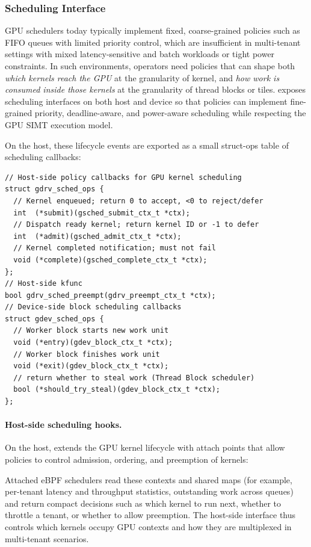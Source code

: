 \subsubsection{Scheduling Interface}
\label{sec:design-sched}

GPU schedulers today typically implement fixed, coarse-grained policies such as FIFO
queues with limited priority control, which are insufficient in multi-tenant settings
with mixed latency-sensitive and batch workloads or tight power constraints. In such
environments, operators need policies that can shape both \emph{which kernels reach
the GPU} at the granularity of kernel, and \emph{how work is consumed inside those kernels} at the granularity of thread blocks or tiles. \sys exposes scheduling interfaces on both host and device
so that policies can implement fine-grained priority, deadline-aware, and power-aware
scheduling while respecting the GPU SIMT execution model.

On the host, these lifecycle events are exported as a small struct-ops table of
scheduling callbacks:

\begin{verbatim}
// Host-side policy callbacks for GPU kernel scheduling
struct gdrv_sched_ops {
  // Kernel enqueued; return 0 to accept, <0 to reject/defer
  int  (*submit)(gsched_submit_ctx_t *ctx);
  // Dispatch ready kernel; return kernel ID or -1 to defer
  int  (*admit)(gsched_admit_ctx_t *ctx);
  // Kernel completed notification; must not fail
  void (*complete)(gsched_complete_ctx_t *ctx);
};
// Host-side kfunc
bool gdrv_sched_preempt(gdrv_preempt_ctx_t *ctx);
// Device-side block scheduling callbacks
struct gdev_sched_ops {
  // Worker block starts new work unit
  void (*entry)(gdev_block_ctx_t *ctx);
  // Worker block finishes work unit
  void (*exit)(gdev_block_ctx_t *ctx);
  // return whether to steal work (Thread Block scheduler)
  bool (*should_try_steal)(gdev_block_ctx_t *ctx);
};
\end{verbatim}

\paragraph{Host-side scheduling hooks.}
On the host, \sys extends the GPU kernel lifecycle with attach points that allow
policies to control admission, ordering, and preemption of kernels:

Attached eBPF schedulers read these contexts and shared maps (for example, per-tenant
latency and throughput statistics, outstanding work across queues) and return compact
decisions such as which kernel to run next, whether to throttle a tenant, or whether
to allow preemption. The host-side interface thus controls which kernels occupy GPU
contexts and how they are multiplexed in multi-tenant scenarios.
